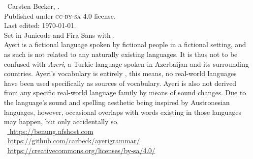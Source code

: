 
\begin{minipage}[b][\textheight][b]{0.67\textwidth}\small
\ccbysa~Carsten Becker, \the\year.\\
Published under \textsc{cc-by-sa} 4.0 license.\\
Last edited: \today{}.\\[.5\baselineskip]

Set in Junicode and {\sffamily Fira Sans} with \XeTeX{}.\\[.5\baselineskip]

Ayeri is a fictional language spoken by fictional people in a fictional setting, 
and as such is not related to any naturally existing languages. It is thus not 
to be confused with \emph{Azeri}, a Turkic language spoken in Azerbaijan and its 
surrounding countries. Ayeri’s vocabulary is entirely , this 
means, no real-world languages have been used specifically as sources of 
vocabulary. Ayeri is also not derived from any specific real-world language 
family by means of sound changes. Due to the language’s sound and spelling 
aesthetic being inspired by Austronesian languages, however, occasional 
overlaps with words existing in those languages may happen, but only  
accidentally so.\\[.5\baselineskip]

~\href{https://benung.nfshost.com}{%
https://benung.nfshost.com}\\
%
~\href{https://github.com/carbeck/ayerigrammar}
{https://github.com/carbeck/ayerigrammar/}\\
%
~\href{%
https://creativecommons.org/licenses/by-sa/4.0/}%
{https://creativecommons.org/licenses/by-sa/4.0/}%

\end{minipage}
